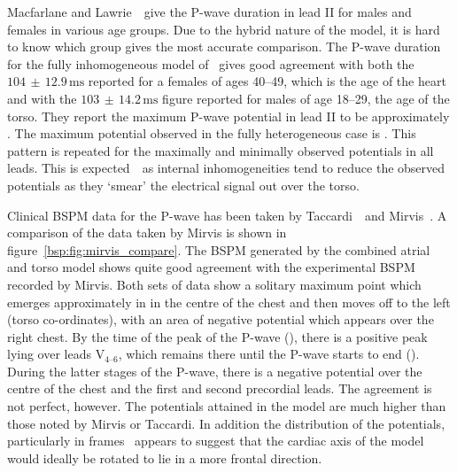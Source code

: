Macfarlane and Lawrie~\cite{MacFarlane1989}\ give the P-wave duration in
lead II for males and females in various age groups.
Due to the hybrid nature of the model, it is hard to know which group gives the
most accurate comparison.
The P-wave duration for the fully inhomogeneous model of \ gives good
agreement with both the $104\,\pm\,12.9\,\text{ms}$ reported for a females of
ages 40--49, which is the age of the heart and with the
$103\,\pm\,14.2\,\text{ms}$ figure reported for males of age 18--29, the age of
the torso.
They report the maximum P-wave potential in lead II to be approximately
.
The maximum potential observed in the fully heterogeneous case is .
This pattern is repeated for the maximally and minimally observed potentials in
all leads.
This is expected~\cite{Rudy2006,Gulrajani1983,Gulrajani1989,Klepfer1997}\ as internal
inhomogeneities tend to reduce the observed potentials as they `smear' the
electrical signal out over the torso.

Clinical BSPM data for the P-wave has been taken by
Taccardi~\cite{Taccardi1966}\ and Mirvis~\cite{Mirvis1980}.
A comparison of the data taken by Mirvis is shown in
figure~\ref{bsp:fig:mirvis_compare}.
The BSPM generated by the combined atrial and torso model shows quite good
agreement with the experimental BSPM recorded by Mirvis.
Both sets of data show a solitary maximum point which emerges approximately in
in the centre of the chest and then moves off to the left (torso co-ordinates),
with an area of negative potential which appears over the right chest.
By the time of the peak of the P-wave (), there is a positive peak
lying over leads $\text{V}_{\text{4--6}}$, which remains there until the P-wave
starts to end ().
During the latter stages of the P-wave, there is a negative potential over the
centre of the chest and the first and second precordial leads.
The agreement is not perfect, however.
The potentials attained in the model are much higher than those noted by Mirvis
or Taccardi.
In addition the distribution of the potentials, particularly in frames
\ appears to suggest that the cardiac axis of the model would ideally
be rotated to lie in a more frontal direction.

